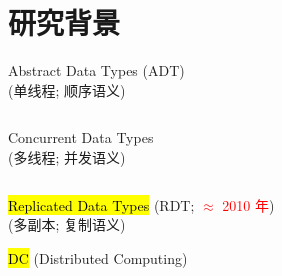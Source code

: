 
\section{研究背景}

\begin{frame}{}
  \begin{center}
    {\large Abstract Data Types} (\textsc{ADT})  \\[8pt]

    (单线程; 顺序语义)
  \end{center}

  \begin{columns}
    \pause
  \end{columns}
\end{frame}

\begin{frame}{}
  \begin{center}
    {\large Concurrent Data Types}  \\[8pt]

    (多线程; 并发语义)
  \end{center}

  \begin{columns}
    \pause

  \end{columns}
\end{frame}

\begin{frame}{}
  \begin{center}
    \hl{\Large Replicated Data Types} {(\textsc{RDT}; \textcolor{red}{$\approx$ 2010 年})}  \\[8pt]

    (多副本; 复制语义)
  \end{center}

  \pause

  \pause
  \begin{center}
    \hl{\Large DC} {(Distributed Computing)}
  \end{center}
\end{frame}

